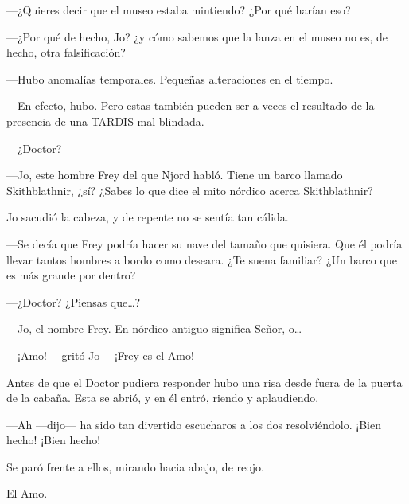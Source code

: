 ---¿Quieres decir que el museo estaba mintiendo? ¿Por qué harían eso?

---¿Por qué de hecho, Jo? ¿y cómo sabemos que la lanza en el museo no
es, de hecho, otra falsificación?

---Hubo anomalías temporales. Pequeñas alteraciones en el tiempo.

---En efecto, hubo. Pero estas también pueden ser a veces el resultado
de la presencia de una TARDIS mal blindada.

---¿Doctor?

---Jo, este hombre Frey del que Njord habló. Tiene un barco llamado
Skithblathnir, ¿sí? ¿Sabes lo que dice el mito nórdico acerca
Skithblathnir?

Jo sacudió la cabeza, y de repente no se sentía tan cálida.

---Se decía que Frey podría hacer su nave del tamaño que quisiera. Que
él podría llevar tantos hombres a bordo como deseara. ¿Te suena
familiar? ¿Un barco que es más grande por dentro?

---¿Doctor? ¿Piensas que\ldots{}?

---Jo, el nombre Frey. En nórdico antiguo significa Señor, o\ldots{}

---¡Amo! ---gritó Jo--- ¡Frey es el Amo!

Antes de que el Doctor pudiera responder hubo una risa desde fuera de la
puerta de la cabaña. Esta se abrió, y en él entró, riendo y aplaudiendo.

---Ah ---dijo--- ha sido tan divertido escucharos a los dos
resolviéndolo. ¡Bien hecho! ¡Bien hecho!

Se paró frente a ellos, mirando hacia abajo, de reojo.

El Amo.